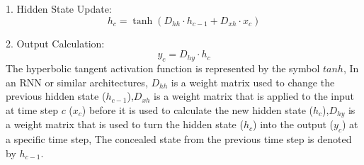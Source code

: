 1. Hidden State Update:
\begin{equation}
h_c = \tanh(D_{hh} \cdot h_{c-1} + D_{xh} \cdot x_c)
\end{equation}

2. Output Calculation:
\begin{equation}
y_c = D_{hy} \cdot h_c
\end{equation}
The hyperbolic tangent activation function is represented by the symbol $tanh$, In an RNN or similar architectures, $D_{hh}$ is a weight matrix used to change the previous hidden state ($h_{c-1}$),$D_{xh}$ is a weight matrix that is applied to the input at time step $c$ ($x_c$) before it is used to calculate the new hidden state ($h_c$),$D_{hy}$ is a weight matrix that is used to turn the hidden state ($h_c$) into the output ($y_c$) at a specific time step, The concealed state from the previous time step is denoted by $h_{c-1}$.










